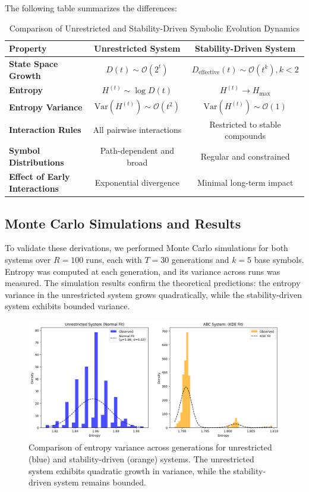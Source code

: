 \documentclass[%
 preprint, linenumbers,
 amsmath,amssymb,
 aps, physrev,
]{revtex4-2}
\begin{document}
The following table summarizes the differences:

\begin{table}[h!]
\caption{Comparison of Unrestricted and Stability-Driven Symbolic Evolution Dynamics}
\label{tab:comparison}
\begin{ruledtabular}
\begin{tabular}{lcc}
\textbf{Property} & \textbf{Unrestricted System} & \textbf{Stability-Driven System} \\ \hline
\textbf{State Space Growth} & $D(t) \sim \mathcal{O}(2^t)$ & $D_\text{effective}(t) \sim \mathcal{O}(t^k), k < 2$ \\ 
\textbf{Entropy} & $H^{(t)} \sim \log D(t)$ & $H^{(t)} \to H_\text{max}$ \\ 
\textbf{Entropy Variance} & $\text{Var}(H^{(t)}) \sim \mathcal{O}(t^2)$ & $\text{Var}(H^{(t)}) \sim \mathcal{O}(1)$ \\ 
\textbf{Interaction Rules} & All pairwise interactions & Restricted to stable compounds \\ 
\textbf{Symbol Distributions} & Path-dependent and broad & Regular and constrained \\ 
\textbf{Effect of Early Interactions} & Exponential divergence & Minimal long-term impact \\
\end{tabular}
\end{ruledtabular}
\end{table}


\subsection{Monte Carlo Simulations and Results}

To validate these derivations, we performed Monte Carlo simulations for both systems over \( R = 100 \) runs, each with \( T = 30 \) generations and \( k = 5 \) base symbols. Entropy was computed at each generation, and its variance across runs was measured. The simulation results confirm the theoretical predictions: the entropy variance in the unrestricted system grows quadratically, while the stability-driven system exhibits bounded variance.

\begin{figure}[h]
    \centering
    \includegraphics[width=0.9\linewidth]{monte-carlo-fits.png}
    \caption{Comparison of entropy variance across generations for unrestricted (blue) and stability-driven (orange) systems. The unrestricted system exhibits quadratic growth in variance, while the stability-driven system remains bounded.}
    \label{fig:entropy_variance}
\end{figure}
\end{document}
